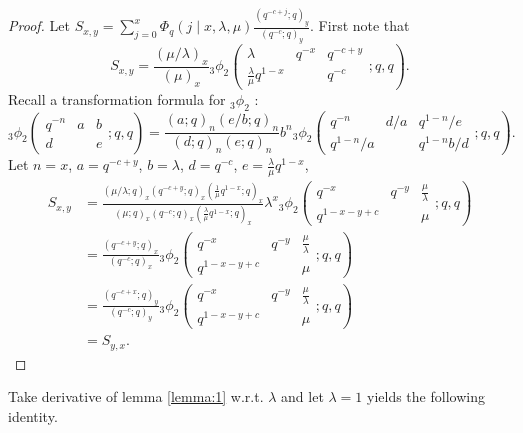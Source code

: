 \documentclass{ximera}
\begin{document}
\begin{proof}
Let $S_{x,y}=\sum_{j=0}^x\Phi_q(j\mid x,\lambda,\mu)\frac{(q^{-c+j};q)_y}{(q^{-c};q)_y}$.  First note that 
\begin{equation*}
    S_{x,y}=\frac{(\mu/\lambda)_x}{(\mu)_x}{ }_{3} \phi_{2}\left(\begin{matrix}
\lambda & q^{-x} & q^{-c+y}\\
\frac{\lambda}{\mu}q^{1-x} &  & q^{-c}
\end{matrix};q,q\right).
\end{equation*}
Recall a transformation formula for ${ }_{3} \phi_{2}$ \cite{Gas96}:
\begin{equation*}
    { }_{3} \phi_{2}\left(\begin{matrix}
 q^{-n} & a & b\\
d &  & e
\end{matrix};q,q\right)=\frac{(a;q)_n(e/b;q)_n}{(d;q)_n(e;q)_n}b^n{ }_{3} \phi_{2}\left(\begin{matrix}
 q^{-n} & d/a &  q^{1-n}/e\\
q^{1-n}/a &  & q^{1-n}b/d
\end{matrix};q,q\right).
\end{equation*}
Let $n=x$, $a=q^{-c+y}$, $b=\lambda$, $d=q^{-c}$, $e=\frac{\lambda}{\mu}q^{1-x}$,
\begin{align*}
  S_{x,y}   &  =\frac{\left(\mu/\lambda;q\right)_x\left(q^{-c+y};q\right)_x\left(\frac{1}{\mu}q^{1-x};q\right)_x}{\left(\mu;q\right)_x\left(q^{-c};q\right)_x\left(\frac{\lambda}{\mu}q^{1-x};q\right)_x}\lambda^x{ }_{3} \phi_{2}\left(\begin{matrix}
 q^{-x} & q^{-y} &  \frac{\mu}{\lambda}\\
q^{1-x-y+c} &  & \mu
\end{matrix};q,q\right)\\
     & =\frac{\left(q^{-c+y};q\right)_x}{\left(q^{-c};q\right)_x}{ }_{3} \phi_{2}\left(\begin{matrix}
 q^{-x} & q^{-y} &  \frac{\mu}{\lambda}\\
q^{1-x-y+c} &  & \mu
\end{matrix};q,q\right)\\
&=\frac{\left(q^{-c+x};q\right)_y}{\left(q^{-c};q\right)_y}{ }_{3} \phi_{2}\left(\begin{matrix}
 q^{-x} & q^{-y} &  \frac{\mu}{\lambda}\\
q^{1-x-y+c} &  & \mu
\end{matrix};q,q\right)\\
&=S_{y,x}.
\end{align*}
\end{proof}
\normalsize
\noindent
Take derivative of lemma \ref{lemma:1} w.r.t. $\lambda$ and let $\lambda=1$ yields the following identity.
 
\end{document}
